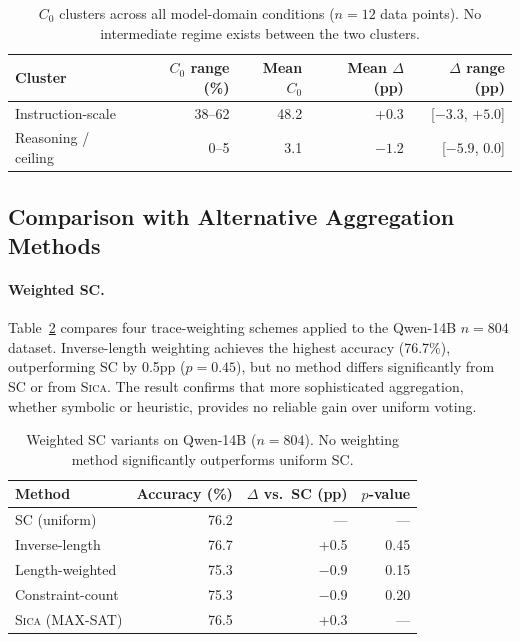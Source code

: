\documentclass[11pt,a4paper]{article}
\newcommand{\sica}{\textsc{Sica}}
\newcommand{\czero}{C_0}
\begin{document}
\begin{table}[t]
\centering
\caption{$\czero$ clusters across all model-domain conditions ($n = 12$ data points). No intermediate regime exists between the two clusters.}
\label{tab:c0}
\small
\begin{tabular}{lrrrr}
\toprule
\textbf{Cluster} & \textbf{$\czero$ range (\%)} & \textbf{Mean $\czero$} & \textbf{Mean $\Delta$ (pp)} & \textbf{$\Delta$ range (pp)} \\
\midrule
Instruction-scale & 38--62 & 48.2 & +0.3 & [$-3.3$, $+5.0$] \\
Reasoning / ceiling & 0--5 & 3.1 & $-1.2$ & [$-5.9$, $0.0$] \\
\bottomrule
\end{tabular}
\end{table}

\subsection{Comparison with Alternative Aggregation Methods}

\paragraph{Weighted SC.} Table~\ref{tab:weighted} compares four trace-weighting schemes applied to the Qwen-14B $n = 804$ dataset. Inverse-length weighting achieves the highest accuracy (76.7\%), outperforming SC by 0.5pp ($p = 0.45$), but no method differs significantly from SC or from \sica{}. The result confirms that more sophisticated aggregation, whether symbolic or heuristic, provides no reliable gain over uniform voting.

\begin{table}[t]
\centering
\caption{Weighted SC variants on Qwen-14B ($n = 804$). No weighting method significantly outperforms uniform SC.}
\label{tab:weighted}
\small
\begin{tabular}{lrrr}
\toprule
\textbf{Method} & \textbf{Accuracy (\%)} & \textbf{$\Delta$ vs.\ SC (pp)} & \textbf{$p$-value} \\
\midrule
SC (uniform) & 76.2 & --- & --- \\
Inverse-length & 76.7 & +0.5 & 0.45 \\
Length-weighted & 75.3 & $-0.9$ & 0.15 \\
Constraint-count & 75.3 & $-0.9$ & 0.20 \\
\sica{} (MAX-SAT) & 76.5 & +0.3 & --- \\
\bottomrule
\end{tabular}
\end{table}
\end{document}
